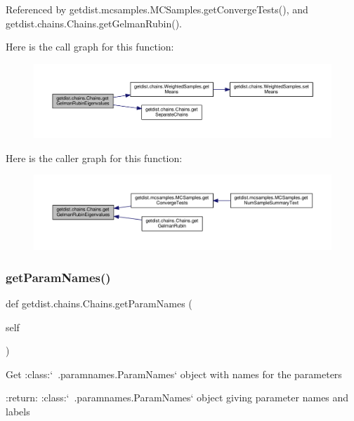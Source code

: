 Referenced by getdist.\+mcsamples.\+M\+C\+Samples.\+get\+Converge\+Tests(), and getdist.\+chains.\+Chains.\+get\+Gelman\+Rubin().

Here is the call graph for this function\+:
\nopagebreak
\begin{figure}[H]
\begin{center}
\leavevmode
\includegraphics[width=350pt]{classgetdist_1_1chains_1_1Chains_a0485362be9aa8aa89b8071b59dbefae5_cgraph}
\end{center}
\end{figure}
Here is the caller graph for this function\+:
\nopagebreak
\begin{figure}[H]
\begin{center}
\leavevmode
\includegraphics[width=350pt]{classgetdist_1_1chains_1_1Chains_a0485362be9aa8aa89b8071b59dbefae5_icgraph}
\end{center}
\end{figure}
\mbox{\label{classgetdist_1_1chains_1_1Chains_a2fa727ae561b8f2735806eac170a6f96}} 
\subsubsection{\texorpdfstring{get\+Param\+Names()}{getParamNames()}}
{\footnotesize\ttfamily def getdist.\+chains.\+Chains.\+get\+Param\+Names (\begin{DoxyParamCaption}\item[{}]{self }\end{DoxyParamCaption})}

\begin{DoxyVerb}Get :class:`~.paramnames.ParamNames` object with names for the parameters

:return: :class:`~.paramnames.ParamNames` object giving parameter names and labels
\end{DoxyVerb}
 

